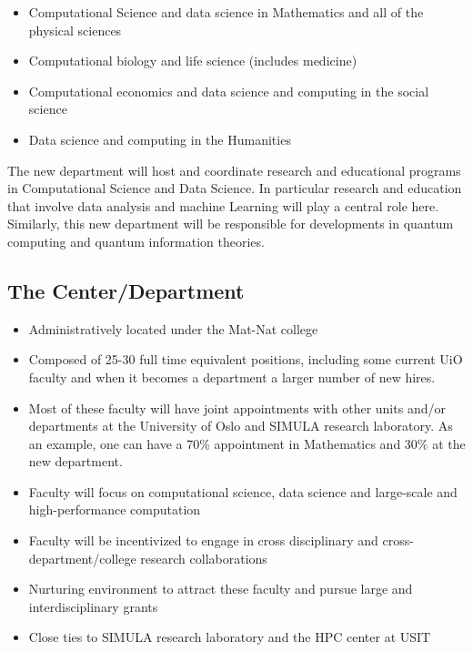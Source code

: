 \documentclass[%
oneside,                 %
final,                   %
10pt]{article}
\begin{document}
\begin{itemize}
\item Computational Science and data science in Mathematics and all of the physical sciences

\item Computational biology and life science (includes medicine)

\item Computational economics and data science and computing in the social science

\item Data science and computing in the Humanities
\end{itemize}

\noindent
The new department will host and coordinate research and educational programs in Computational Science and Data Science. In particular research and education that involve  data analysis and machine Learning will play a central role here. Similarly, this new department will be responsible for developments in quantum computing and quantum information theories. 

\subsection*{The Center/Department}
\begin{itemize}
\item Administratively located under the Mat-Nat college

\item Composed of 25-30 full time equivalent positions, including some current UiO faculty and when it becomes a department a larger number of new hires.

\item Most of these faculty will have joint appointments with other units and/or departments at the University of Oslo and SIMULA research laboratory. As an example, one can have a 70\% appointment in Mathematics and 30\% at the new department. 

\item Faculty will focus on computational science, data science and large-scale and high-performance computation	

\item Faculty will be incentivized to engage in cross disciplinary and cross-department/college research collaborations	

\item Nurturing environment to attract these faculty and pursue large and interdisciplinary grants	

\item Close ties to SIMULA research laboratory and the HPC center at USIT
\end{itemize}
\end{document}
